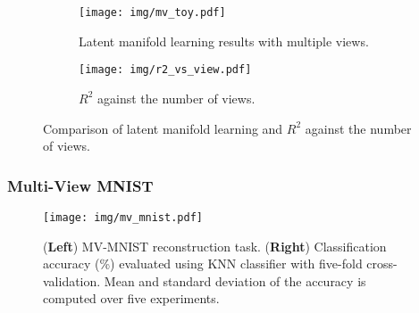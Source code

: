 \begin{figure}[t!]
    \centering
    \begin{subfigure}{0.48\linewidth}
        \centering
        \texttt{[image: img/mv\_toy.pdf]}
        \caption{Latent manifold learning results with multiple views.}
        \label{fig:mv_synthetic}
    \end{subfigure}
    \hfill %
    \begin{subfigure}{0.48\linewidth}
        \centering
        \texttt{[image: img/r2\_vs\_view.pdf]}
        \caption{$R^2$ against the number of views.}
        \label{fig:r2_vs_view}
    \end{subfigure}
    \vspace{-0.1in} %
    \caption{Comparison of latent manifold learning and $R^2$ against the number of views.}
    \label{fig:combined_figure}
\end{figure}


\subsubsection{Multi-View MNIST}
\label{app:mv_mnist}



\begin{figure*}[t!]
    \centering
    \caption{(\textbf{Left}) \MakeUppercase{mv-mnist} reconstruction task. (\textbf{Right}) Classification accuracy (\%) evaluated using KNN classifier with five-fold cross-validation. Mean and standard deviation of the accuracy is computed over five experiments. 
    \vspace{-.15in}
    }
    \centering
    \texttt{[image: img/mv\_mnist.pdf]} 
    \vspace{-0.1in}
    \label{fig:mv_mnist}
\end{figure*}




